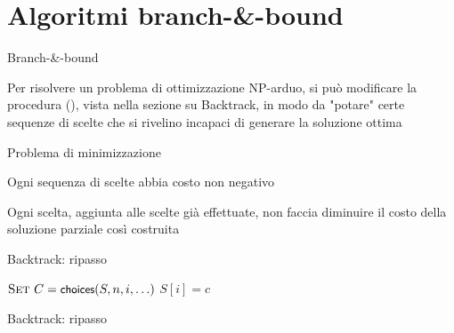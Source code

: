 \section{Algoritmi branch-\&-bound}

\begin{frame}{Branch-\&-bound}

\begin{block}{}
Per risolvere un problema di ottimizzazione NP-arduo, si può modificare la
procedura \enumerazione(), vista nella sezione su Backtrack, in modo da
"potare" certe sequenze di scelte che si rivelino incapaci di
generare la soluzione ottima
\end{block}

\bigskip
{}
\BIL
\item Problema di minimizzazione
\item Ogni sequenza di scelte abbia costo non negativo
\item Ogni scelta, aggiunta alle scelte già effettuate, non faccia 
diminuire il costo della soluzione parziale così costruita
\EIL
    
\end{frame}

\begin{frame}{Backtrack: ripasso}
    
\begin{Procedure}
\caption[A]{\BOOLEAN\ \enumerazione($\Item[\,]\ S$, \INTEGER $n$, \INTEGER\ $i$, \mldots)}
$\textsc{Set}\ C = \textsf{{\small choices}}(S, n, i, \ldots)$
{
  $S[i] = c$\;
  {
  }
}
\Return \FALSE\;
\end{Procedure}
        
\end{frame}

\begin{frame}{Backtrack: ripasso}
    
    
\end{frame}


